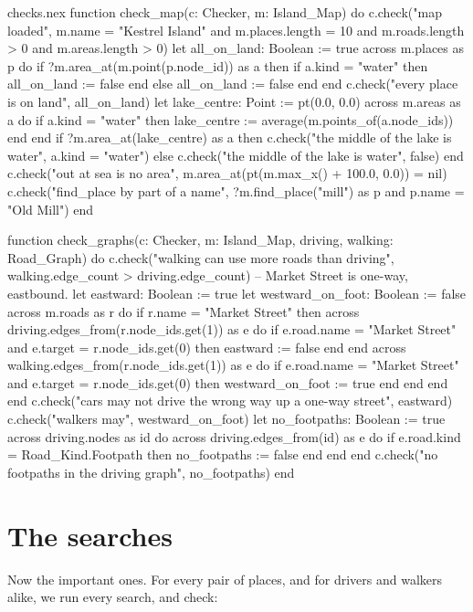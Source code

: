 \begin{append}{checks.nex}
function check_map(c: Checker, m: Island_Map) do
  c.check("map loaded", m.name = "Kestrel Island" and m.places.length = 10
    and m.roads.length > 0 and m.areas.length > 0)
  let all_on_land: Boolean := true
  across m.places as p do
    if ?m.area_at(m.point(p.node_id)) as a then
      if a.kind = "water" then
        all_on_land := false
      end
    else
      all_on_land := false
    end
  end
  c.check("every place is on land", all_on_land)
  let lake_centre: Point := pt(0.0, 0.0)
  across m.areas as a do
    if a.kind = "water" then
      lake_centre := average(m.points_of(a.node_ids))
    end
  end
  if ?m.area_at(lake_centre) as a then
    c.check("the middle of the lake is water", a.kind = "water")
  else
    c.check("the middle of the lake is water", false)
  end
  c.check("out at sea is no area", m.area_at(pt(m.max_x() + 100.0, 0.0)) = nil)
  c.check("find_place by part of a name", ?m.find_place("mill") as p and p.name = "Old Mill")
end

function check_graphs(c: Checker, m: Island_Map, driving, walking: Road_Graph) do
  c.check("walking can use more roads than driving", walking.edge_count > driving.edge_count)
  -- Market Street is one-way, eastbound.
  let eastward: Boolean := true
  let westward_on_foot: Boolean := false
  across m.roads as r do
    if r.name = "Market Street" then
      across driving.edges_from(r.node_ids.get(1)) as e do
        if e.road.name = "Market Street" and e.target = r.node_ids.get(0) then
          eastward := false
        end
      end
      across walking.edges_from(r.node_ids.get(1)) as e do
        if e.road.name = "Market Street" and e.target = r.node_ids.get(0) then
          westward_on_foot := true
        end
      end
    end
  end
  c.check("cars may not drive the wrong way up a one-way street", eastward)
  c.check("walkers may", westward_on_foot)
  let no_footpaths: Boolean := true
  across driving.nodes as id do
    across driving.edges_from(id) as e do
      if e.road.kind = Road_Kind.Footpath then
        no_footpaths := false
      end
    end
  end
  c.check("no footpaths in the driving graph", no_footpaths)
end
\end{append}

\section{The searches}

Now the important ones. For every pair of places, and for drivers and
walkers alike, we run every search, and check:

